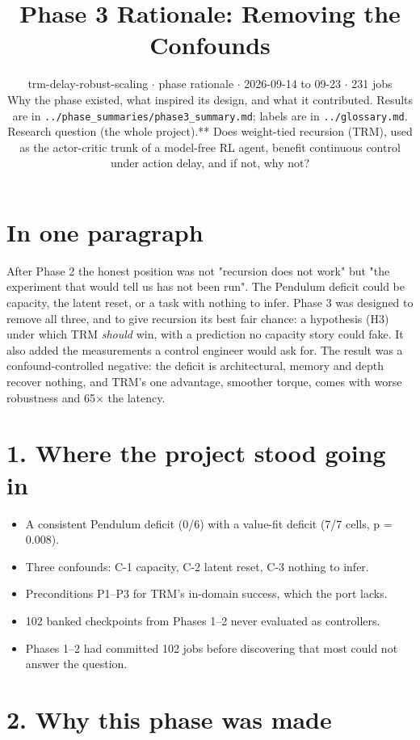 \documentclass[11pt]{article}
\title{Phase 3 Rationale: Removing the Confounds}
\author{}
\date{trm-delay-robust-scaling $\cdot$ phase rationale $\cdot$ 2026-09-14 to 09-23 $\cdot$ 231 jobs\\[2pt]Why the phase existed, what inspired its design, and what it contributed. Results are in \texttt{.\allowbreak{}.\allowbreak{}/\allowbreak{}phase\_\allowbreak{}summaries/\allowbreak{}phase3\_\allowbreak{}summary.\allowbreak{}md}; labels are in \texttt{.\allowbreak{}.\allowbreak{}/\allowbreak{}glossary.\allowbreak{}md}.\\[2pt]Research question (the whole project).** Does weight-tied recursion (TRM), used as the actor-critic trunk of a model-free RL agent, benefit continuous control under action delay, and if not, why not?}
\begin{document}
\maketitle
\section*{In one paragraph}



After Phase 2 the honest position was not "recursion does not work" but "the experiment that would tell us has not been run". The Pendulum deficit could be capacity, the latent reset, or a task with nothing to infer. Phase 3 was designed to remove all three, and to give recursion its best fair chance: a hypothesis (H3) under which TRM \emph{should} win, with a prediction no capacity story could fake. It also added the measurements a control engineer would ask for. The result was a confound-controlled negative: the deficit is architectural, memory and depth recover nothing, and TRM's one advantage, smoother torque, comes with worse robustness and 65$\times$ the latency.



\section*{1. Where the project stood going in}



\begin{itemize}
\item A consistent Pendulum deficit (0/6) with a value-fit deficit (7/7 cells, p = 0.008).
\item Three confounds: C-1 capacity, C-2 latent reset, C-3 nothing to infer.
\item Preconditions P1--P3 for TRM's in-domain success, which the port lacks.
\item 102 banked checkpoints from Phases 1--2 never evaluated as controllers.
\item Phases 1--2 had committed 102 jobs before discovering that most could not answer the question.
\end{itemize}



\section*{2. Why this phase was made}
\end{document}

